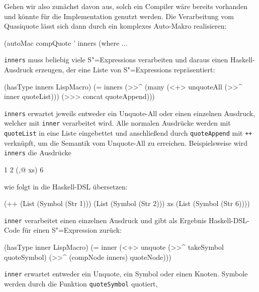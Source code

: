 \documentclass[12pt, a4paper, bibgerm]{scrbook}
\newenvironment{DIFnomarkup}{}{}
\newcommand\icode[1]{\lstinline?#1?}
\newcommand{\sexp}{S"=Expression}
\newcommand{\sexps}{S"=Expressions}
\begin{document}
Gehen wir also zunächst davon aus, solch ein Compiler wäre bereits
vorhanden und könnte für die Implementation genutzt werden. Die
Verarbeitung vom Quasiquote lässt sich dann durch ein komplexes
Auto-Makro realisieren:
\begin{DIFnomarkup}\begin{code}
(autoMac compQuote ' inners
  (where
    ...
\end{code}\end{DIFnomarkup}
\icode{inners} muss beliebig viele \sexps{} verarbeiten und daraus einen
Haskell-Ausdruck erzeugen, der eine Liste von \sexps{}
repräsentiert:
\begin{DIFnomarkup}\begin{code}
    (hasType inners LispMacro)
    (= inners
       (>>^ (many (<+> unquoteAll 
                       (>>^ inner quoteList)))
            (>>> concat quoteAppend)))
\end{code}\end{DIFnomarkup}
\icode{inners} erwartet jeweils entweder ein Unquote-All oder einen
einzelnen Ausdruck, welcher mit \icode{inner} verarbeitet wird. Alle
normalen Ausdrücke werden mit \icode{quoteList} in eine Liste
eingebettet und anschließend durch \icode{quoteAppend} mit \icode{++}
verknüpft, um die Semantik vom Unquote-All zu erreichen. Beispielsweise
wird \icode{inners} die Ausdrücke 
\begin{DIFnomarkup}\begin{code}
1 2 (,@ xs) 6  
\end{code}\end{DIFnomarkup}
wie folgt in die Haskell-DSL übersetzen:
\begin{DIFnomarkup}\begin{code}
(++ (List (Symbol (Str 1)))
    (List (Symbol (Str 2)))
    xs    
    (List (Symbol (Str 6))))
\end{code}\end{DIFnomarkup}
\icode{inner} verarbeitet einen einzelnen Ausdruck und gibt als Ergebnis
Haskell-DSL-Code für einen \sexp{} zurück:
\begin{DIFnomarkup}\begin{code}
    (hasType inner LispMacro)
    (= inner (<+> unquote    
                  (>>^ takeSymbol quoteSymbol)     
                  (>>^ (compNode inners) quoteNode)))
\end{code}\end{DIFnomarkup}
\icode{inner} erwartet entweder ein Unquote, ein Symbol oder einen
Knoten. Symbole werden durch die Funktion \icode{quoteSymbol} quotiert,
\end{document}

